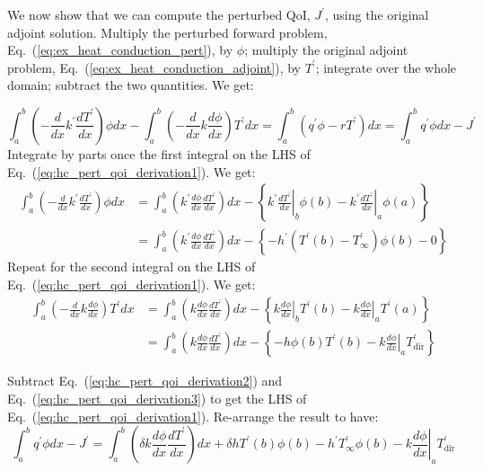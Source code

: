 \documentclass[11pt]{article}
\newcommand{\eqt}[1]{Eq.~(\ref{#1})}                     %
\newcommand{\be}{\begin{equation}}
\newcommand{\ee}{\end{equation}}
\begin{document}
We now show that we can compute the perturbed QoI, $J^\prime$, using the original adjoint solution. 
Multiply the perturbed forward problem, \eqt{eq:ex_heat_conduction_pert}, by $\phi$; multiply the original adjoint problem, \eqt{eq:ex_heat_conduction_adjoint}, by $\boxed{T^\prime}$;  integrate over the whole domain; subtract the two quantities. We get:

\be
\label{eq:hc_pert_qoi_derivation1}
\int_a^b \left( -\frac{d}{dx}k^\prime\frac{dT^\prime   }{dx} \right) \phi dx - 
\int_a^b \left( -\frac{d}{dx}k\frac{d\phi}{dx} \right) T^\prime    dx = \int_a^b ( q^\prime \phi - r T^\prime ) dx = \int_a^b q^\prime \phi dx - J^\prime
\ee
Integrate by parts once the first integral on the LHS of \eqt{eq:hc_pert_qoi_derivation1}. We get:
\begin{align}
\label{eq:hc_pert_qoi_derivation2}
\int_a^b \left( -\frac{d}{dx}k^\prime\frac{dT^\prime   }{dx} \right) \phi dx 
&= 
\int_a^b \left( k^\prime\frac{d\phi}{dx}\frac{dT^\prime}{dx} \right) dx 
- \left\{\left.k^\prime\frac{dT^\prime}{dx}\right|_b \phi(b) - 
         \left.k^\prime\frac{dT^\prime}{dx}\right|_a \phi(a) \right\} 
\nonumber \\
&= 
\int_a^b \left( k^\prime\frac{d\phi}{dx}\frac{dT^\prime}{dx} \right) dx 
- \left\{-h^\prime(T^\prime(b)-T^\prime_{\infty})\phi(b) - 0 \right\}
\end{align}
Repeat for the second integral on the LHS of \eqt{eq:hc_pert_qoi_derivation1}. We get:
\begin{align}
\label{eq:hc_pert_qoi_derivation3}
\int_a^b \left( -\frac{d}{dx}k\frac{d\phi}{dx} \right) T^\prime    dx 
&= 
\int_a^b \left( k\frac{d\phi}{dx}\frac{dT^\prime}{dx} \right) dx 
- \left\{\left.k\frac{d\phi}{dx}\right|_b T^\prime(b) - 
         \left.k\frac{d\phi}{dx}\right|_a T^\prime(a) \right\} 
\nonumber \\
&= 
\int_a^b \left( k\frac{d\phi}{dx}\frac{dT^\prime}{dx} \right) dx 
- \left\{-h\phi(b)T^\prime(b) - \left.k\frac{d\phi}{dx}\right|_a T^\prime_{\text{dir}} \right\}
\end{align}

Subtract \eqt{eq:hc_pert_qoi_derivation2} and \eqt{eq:hc_pert_qoi_derivation3} to get the LHS of \eqt{eq:hc_pert_qoi_derivation1}. Re-arrange the result to have:
\be
\int_a^b q^\prime \phi dx - J^\prime
=
\int_a^b \left( \delta k\frac{d\phi}{dx}\frac{dT^\prime}{dx} \right) dx 
+
\delta h T^\prime(b) \phi(b) - h^\prime T^\prime_{\infty} \phi(b) 
- \left.k\frac{d\phi}{dx}\right|_a T^\prime_{\text{dir}} 
\ee
\end{document}
